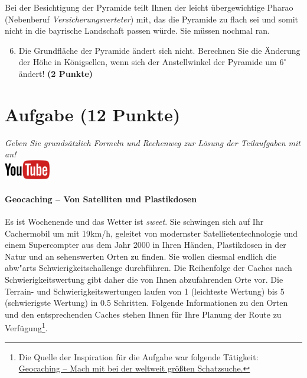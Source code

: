 \documentclass[a4paper, 9pt]{scrartcl}\usepackage[]{graphicx}\usepackage[]{xcolor}
\begin{document}
Bei der Besichtigung der Pyramide teilt Ihnen der leicht {\"u}bergewichtige
Pharao (Nebenberuf \textit{Versicherungsverteter}) mit, das die Pyramide zu
flach sei und somit nicht in die bayrische Landschaft passen
w{\"u}rde. Sie m{\"u}ssen nochmal ran.

\begin{enumerate}
  \setcounter{enumi}{5}
\item Die Grundfl{\"a}che der Pyramide {\"a}ndert sich nicht. Berechnen Sie die
  {\"A}nderung der H{\"o}he in K{\"o}nigsellen, wenn sich der Anstellwinkel der
  Pyramide um $6^\circ$ {\"a}ndert!  \textbf{(2 Punkte)}
\end{enumerate}



\clearpage

\section{Aufgabe \hfill (12 Punkte)}

\textit{Geben Sie grunds{\"a}tzlich Formeln und Rechenweg zur L{\"o}sung der
  Teilaufgaben mit an!} \\[1Ex]

\hfill\href{https://youtu.be/3LAq3R0rS14}{\includegraphics[width =
  2cm]{img/youtube}} %
\hspace{2Ex}

\paragraph{Geocaching -- Von Satelliten und Plastikdosen}



Es ist Wochenende und das Wetter ist \textit{sweet}. Sie schwingen sich auf
Ihr Cachermobil um mit 19km/h, geleitet von modernster
Satellietentechnologie und einem Supercompter aus dem Jahr 2000 in Ihren
H{\"a}nden, Plastikdosen in der Natur und an sehenswerten Orten zu finden. Sie
wollen diesmal endlich die abw{"a}rts Schwierigkeitschallenge
durchf{\"u}hren. Die Reihenfolge der Caches nach Schwierigkeitswertung gibt daher
die von Ihnen abzufahrenden Orte vor. Die Terrain- und
Schwierigkeitswertungen laufen von 1 (leichteste Wertung) bis 5
(schwierigste Wertung) in 0.5 Schritten. Folgende Informationen zu den
Orten und den entsprechenden Caches stehen Ihnen f{\"u}r Ihre Planung der Route
zu Verf{\"u}gung\footnote{Die Quelle der Inspiration
  für die Aufgabe war folgende Tätigkeit:
  \href{https://www.geocaching.com/play}{Geocaching -- Mach mit bei der weltweit größten Schatzsuche.}}.
\end{document}
